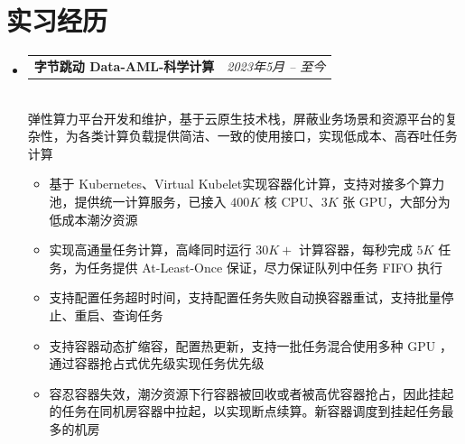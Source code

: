 \documentclass[letterpaper,11pt]{article}
\makeatletter
\newcommand{\resumeItem}[2]{
  \item\small{
    \textbf{#1}{ #2 \vspace{-2pt}}
  }
}
\newcommand{\resumeSubheadingtwo}[2]{
  \vspace{-1pt}\item
    \begin{tabular*}{0.97\textwidth}{l@{\extracolsep{\fill}}r}
      \textbf{#1} & \textit{ #2} \\
    \end{tabular*}\vspace{-5pt}
}
\newcommand{\resumeItemListStart}{\vspace{-10pt}\begin{itemize}}
\newcommand{\resumeItemListEnd}{\end{itemize}\vspace{-10pt}}
\makeatother
\begin{document}
\section{实习经历}
    \begin{itemize}[leftmargin=*,itemsep=-10pt]
        \resumeSubheadingtwo
            {字节跳动 Data-AML-科学计算}{2023年5月 -- 至今}
            \\[10pt]
            弹性算力平台开发和维护，基于云原生技术栈，屏蔽业务场景和资源平台的复杂性，为各类计算负载提供简洁、一致的使用接口，实现低成本、高吞吐任务计算
            \resumeItemListStart
                 \resumeItem{}
                {基于 Kubernetes、Virtual Kubelet实现容器化计算，支持对接多个算力池，提供统一计算服务，已接入 $400K$ 核 CPU、$3K$ 张 GPU，大部分为低成本潮汐资源}
                \resumeItem{}
                {实现高通量任务计算，高峰同时运行 $30K+$ 计算容器，每秒完成 $5K$ 任务，为任务提供 At-Least-Once 保证，尽力保证队列中任务 FIFO 执行}
                \resumeItem{}
                {支持配置任务超时时间，支持配置任务失败自动换容器重试，支持批量停止、重启、查询任务}
                \resumeItem{}
                {支持容器动态扩缩容，配置热更新，支持一批任务混合使用多种 GPU ，通过容器抢占式优先级实现任务优先级}
                \resumeItem{}
                {容忍容器失效，潮汐资源下行容器被回收或者被高优容器抢占，因此挂起的任务在同机房容器中拉起，以实现断点续算。新容器调度到挂起任务最多的机房}
            \resumeItemListEnd
    \end{itemize}

\vspace{-10pt}
\end{document}
